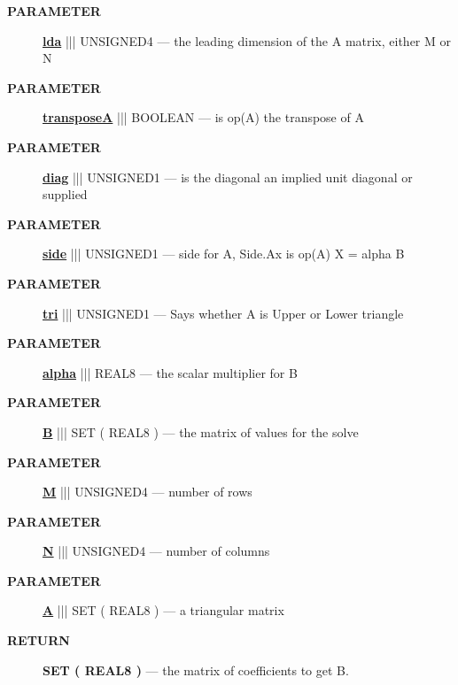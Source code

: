 \par
\begin{description}
\item [\colorbox{tagtype}{\color{white} \textbf{\textsf{PARAMETER}}}] \textbf{\underline{lda}} ||| UNSIGNED4 --- the leading dimension of the A matrix, either M or N
\item [\colorbox{tagtype}{\color{white} \textbf{\textsf{PARAMETER}}}] \textbf{\underline{transposeA}} ||| BOOLEAN --- is op(A) the transpose of A
\item [\colorbox{tagtype}{\color{white} \textbf{\textsf{PARAMETER}}}] \textbf{\underline{diag}} ||| UNSIGNED1 --- is the diagonal an implied unit diagonal or supplied
\item [\colorbox{tagtype}{\color{white} \textbf{\textsf{PARAMETER}}}] \textbf{\underline{side}} ||| UNSIGNED1 --- side for A, Side.Ax is op(A) X = alpha B
\item [\colorbox{tagtype}{\color{white} \textbf{\textsf{PARAMETER}}}] \textbf{\underline{tri}} ||| UNSIGNED1 --- Says whether A is Upper or Lower triangle
\item [\colorbox{tagtype}{\color{white} \textbf{\textsf{PARAMETER}}}] \textbf{\underline{alpha}} ||| REAL8 --- the scalar multiplier for B
\item [\colorbox{tagtype}{\color{white} \textbf{\textsf{PARAMETER}}}] \textbf{\underline{B}} ||| SET ( REAL8 ) --- the matrix of values for the solve
\item [\colorbox{tagtype}{\color{white} \textbf{\textsf{PARAMETER}}}] \textbf{\underline{M}} ||| UNSIGNED4 --- number of rows
\item [\colorbox{tagtype}{\color{white} \textbf{\textsf{PARAMETER}}}] \textbf{\underline{N}} ||| UNSIGNED4 --- number of columns
\item [\colorbox{tagtype}{\color{white} \textbf{\textsf{PARAMETER}}}] \textbf{\underline{A}} ||| SET ( REAL8 ) --- a triangular matrix
\end{description}







\par
\begin{description}
\item [\colorbox{tagtype}{\color{white} \textbf{\textsf{RETURN}}}] \textbf{SET ( REAL8 )} --- the matrix of coefficients to get B.
\end{description}




